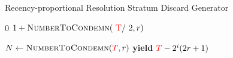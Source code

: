\begin{algorithm}
\caption{Recency-proportional Resolution Stratum Discard Generator}
\label{alg:recency-proportional-algo-gen-drop-ranks}
\begin{algorithmic}
    \Ensure{ $\colorTbar \in [0 \twodots \colorT)$ -- data items to drop, if any }

            \Return $0$
        \Else
            \Return $1 + \Call{NumberToCondemn}{$\colorT / 2$, r}$
        \EndIf
    \EndProcedure

    \State $N \gets \Call{NumberToCondemn}{\colorT, r}$
        \State \textbf{yield} $\colorT - 2^{i}(2r + 1)$
    \EndFor
\end{algorithmic}
\end{algorithm}
